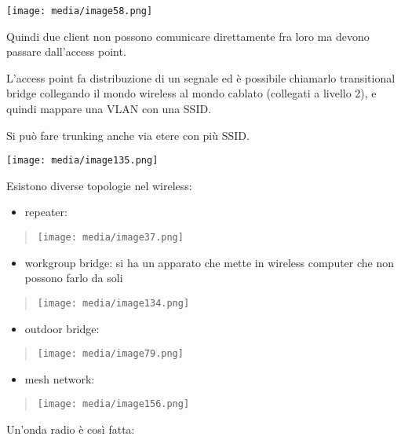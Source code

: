 \texttt{[image: media/image58.png]}

Quindi due client non possono comunicare direttamente fra loro ma devono
passare dall'access point.

L'access point fa distribuzione di un segnale ed è possibile chiamarlo
transitional bridge collegando il mondo wireless al mondo cablato
(collegati a livello 2), e quindi mappare una VLAN con una SSID.

Si può fare trunking anche via etere con più SSID.

\texttt{[image: media/image135.png]}

Esistono diverse topologie nel wireless:

\begin{itemize}
\item
  repeater:
\end{itemize}

\begin{quote}
\texttt{[image: media/image37.png]}
\end{quote}

\begin{itemize}
\item
  workgroup bridge: si ha un apparato che mette in wireless computer che
  non possono farlo da soli
\end{itemize}

\begin{quote}
\texttt{[image: media/image134.png]}
\end{quote}

\begin{itemize}
\item
  outdoor bridge:
\end{itemize}

\begin{quote}
\texttt{[image: media/image79.png]}
\end{quote}

\begin{itemize}
\item
  mesh network:
\end{itemize}

\begin{quote}
\texttt{[image: media/image156.png]}
\end{quote}

Un'onda radio è così fatta:

